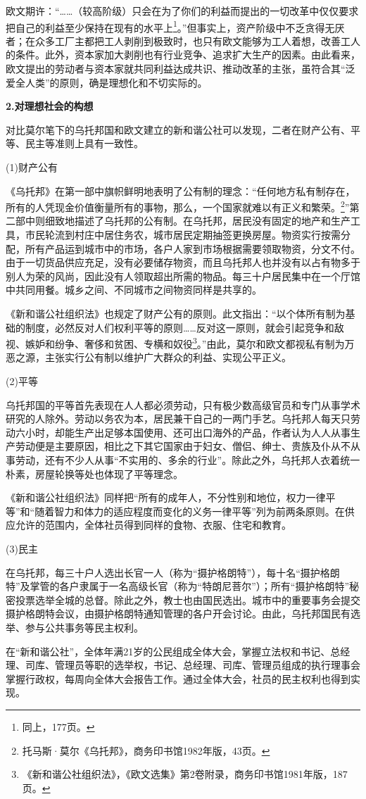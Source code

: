 \par 欧文期许：“……（较高阶级）只会在为了你们的利益而提出的一切改革中仅仅要求把自己的利益至少保持在现有的水平上\footnote{同上，177页。}。”但事实上，资产阶级中不乏贪得无厌者；在众多工厂主都把工人剥削到极致时，也只有欧文能够为工人着想，改善工人的条件。此外，资本家加大剥削也有行业竞争、追求扩大生产的因素。由此看来，欧文提出的劳动者与资本家就共同利益达成共识、推动改革的主张，虽符合其“泛爱全人类”的原则，确是理想化和不切实际的。
 
\par \textbf{2.对理想社会的构想}
\par 对比莫尔笔下的乌托邦国和欧文建立的新和谐公社可以发现，二者在财产公有、平等、民主等准则上具有一致性。
\par (1)财产公有
\par《乌托邦》在第一部中旗帜鲜明地表明了公有制的理念：“任何地方私有制存在，所有的人凭现金价值衡量所有的事物，那么，一个国家就难以有正义和繁荣。\footnote{托马斯·莫尔《乌托邦》，商务印书馆1982年版，43页。}”第二部中则细致地描述了乌托邦的公有制。在乌托邦，居民没有固定的地产和生产工具，市民轮流到村庄中居住务农，城市居民定期抽签更换房屋。物资实行按需分配，所有产品运到城市中的市场，各户人家到市场根据需要领取物资，分文不付。由于一切货品供应充足，没有必要储存物资，而且乌托邦人也并没有以占有物多于别人为荣的风尚，因此没有人领取超出所需的物品。每三十户居民集中在一个厅馆中共同用餐。城乡之间、不同城市之间物资同样是共享的。
\par《新和谐公社组织法》也规定了财产公有的原则。此文指出：“以个体所有制为基础的制度，必然反对人们权利平等的原则……反对这一原则，就会引起竞争和敌视、嫉妒和纷争、奢侈和贫困、专横和奴役\footnote{《新和谐公社组织法》，《欧文选集》第2卷附录，商务印书馆1981年版，187页。}。”由此，莫尔和欧文都视私有制为万恶之源，主张实行公有制以维护广大群众的利益、实现公平正义。
\par (2)平等
\par 乌托邦国的平等首先表现在人人都必须劳动，只有极少数高级官员和专门从事学术研究的人除外。劳动以务农为本，居民兼干自己的一两门手艺。乌托邦人每天只劳动六小时，却能生产出足够本国使用、还可出口海外的产品，作者认为人人从事生产劳动便是主要原因，相比之下其它国家由于妇女、僧侣、绅士、贵族及仆从不从事劳动，还有不少人从事“不实用的、多余的行业”。除此之外，乌托邦人衣着统一朴素，房屋轮换等处也体现了平等理念。
\par 《新和谐公社组织法》同样把“所有的成年人，不分性别和地位，权力一律平等”和“随着智力和体力的适应程度而变化的义务一律平等”列为前两条原则。在供应允许的范围内，全体社员得到同样的食物、衣服、住宅和教育。
\par (3)民主
\par 在乌托邦，每三十户人选出长官一人（称为“摄护格朗特”），每十名“摄护格朗特”及掌管的各户隶属于一名高级长官（称为“特朗尼菩尔”）；所有“摄护格朗特”秘密投票选举全城的总督。除此之外，教士也由国民选出。城市中的重要事务会提交摄护格朗特会议，由摄护格朗特通知管理的各户开会讨论。由此，乌托邦国民有选举、参与公共事务等民主权利。
\par 在“新和谐公社”，全体年满21岁的公民组成全体大会，掌握立法权和书记、总经理、司库、管理员等职的选举权，书记、总经理、司库、管理员组成的执行理事会掌握行政权，每周向全体大会报告工作。通过全体大会，社员的民主权利也得到实现。

